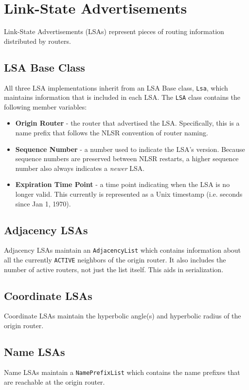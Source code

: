 \section{Link-State Advertisements}
\label{sec:lsas}

Link-State Advertisements (LSAs) represent pieces of routing information distributed by routers.

\subsection{LSA Base Class}
\label{sec:lsa-base-class}

All three LSA implementations inherit from an LSA Base class, \texttt{Lsa}, which maintains information that is included in each LSA.
The \texttt{LSA} class contains the following member variables:
\begin{itemize}
\item \textbf{Origin Router} - the router that advertised the LSA. Specifically, this is a name prefix that follows the NLSR convention of router naming.
\item \textbf{Sequence Number} - a number used to indicate the LSA's version. Because sequence numbers are preserved between NLSR restarts, a higher sequence number also always indicates a \emph{newer} LSA.
\item \textbf{Expiration Time Point} - a time point indicating when the LSA is no longer valid. This currently is represented as a Unix timestamp (i.e. seconds since Jan 1, 1970).
\end{itemize}

\subsection{Adjacency LSAs}
\label{sec:adjacency-lsas}

Adjacency LSAs maintain an \texttt{AdjacencyList} which contains information about all the currently \texttt{ACTIVE} neighbors of the origin router. It also includes the number of active routers, not just the list itself. This aids in serialization.

\subsection{Coordinate LSAs}
\label{sec:coordinate-lsas}

Coordinate LSAs maintain the hyperbolic angle(s) and hyperbolic radius of the origin router.

\subsection{Name LSAs}
\label{sec:name-lsas}

Name LSAs maintain a \texttt{NamePrefixList} which contains the name prefixes that are reachable at the origin router.
